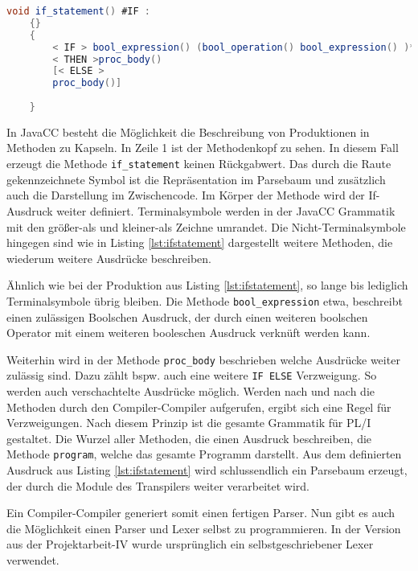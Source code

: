 \begin{lstlisting}[language=Java, caption=If Statement aus der Grammatikdatei, label={lst:ifstatement}]
	void if_statement() #IF :
	{}
	{
		< IF > bool_expression() (bool_operation() bool_expression() )*
		< THEN >proc_body()
		[< ELSE >
		proc_body()]
		
	}
\end{lstlisting}

In JavaCC besteht die Möglichkeit die Beschreibung von Produktionen in Methoden zu Kapseln.
In Zeile 1 ist der Methodenkopf zu sehen. In diesem Fall erzeugt die Methode \verb+if_statement+ keinen Rückgabwert.
Das durch die Raute gekennzeichnete Symbol ist die Repräsentation im Parsebaum und zusätzlich auch die Darstellung im Zwischencode.
Im Körper der Methode wird der If-Ausdruck weiter definiert. Terminalsymbole werden in der JavaCC Grammatik mit den größer-als und kleiner-als Zeichne umrandet. Die Nicht-Terminalsymbole hingegen sind wie in Listing \ref{lst:ifstatement} dargestellt weitere Methoden, die wiederum weitere Ausdrücke beschreiben.

Ähnlich wie bei der Produktion aus Listing \ref{lst:ifstatement}, so lange bis lediglich Terminalsymbole übrig bleiben.
Die Methode \verb+bool_expression+ etwa, beschreibt einen zulässigen Boolschen Ausdruck, der durch einen weiteren boolschen Operator mit einem weiteren booleschen Ausdruck verknüft werden kann.

Weiterhin wird in der Methode \verb+proc_body+ beschrieben welche Ausdrücke weiter zulässig sind. Dazu zählt bspw. auch eine weitere \verb+IF ELSE+ Verzweigung. So werden auch verschachtelte Ausdrücke möglich.
Werden nach und nach die Methoden durch den Compiler-Compiler aufgerufen, ergibt sich eine Regel für Verzweigungen. Nach diesem Prinzip ist die gesamte Grammatik für PL/I gestaltet. 
Die Wurzel aller Methoden, die einen Ausdruck beschreiben, die Methode \verb+program+, welche das gesamte Programm darstellt.
Aus dem definierten Ausdruck aus Listing \ref{lst:ifstatement} wird schlussendlich ein Parsebaum erzeugt, der durch die Module des Transpilers weiter verarbeitet wird.


Ein Compiler-Compiler generiert somit einen fertigen Parser. Nun gibt es auch die Möglichkeit einen Parser und Lexer selbst zu programmieren. In der Version aus der Projektarbeit-IV wurde ursprünglich ein selbstgeschriebener Lexer verwendet.

